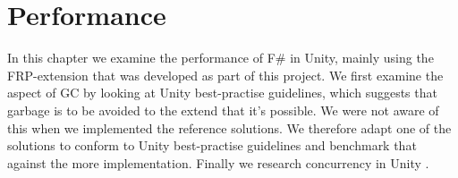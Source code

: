 \section{Performance}
In this chapter we examine the performance of F\# in Unity, mainly using the \gls{FRP}-extension that was developed as part of this project. We first examine the aspect of \gls{GC} by looking at Unity best-practise guidelines, which suggests that garbage is to be avoided to the extend that it's possible. We were not aware of this when we implemented the reference solutions. We therefore adapt one of the solutions to conform to Unity best-practise guidelines and benchmark that against the more  implementation. Finally we research concurrency in Unity .


